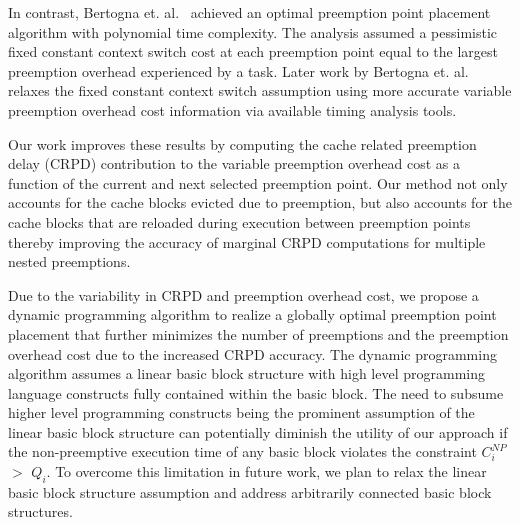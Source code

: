 In contrast, Bertogna et. al.~\cite{bertogna:10} achieved an optimal preemption point placement algorithm with polynomial time complexity.  The analysis assumed a pessimistic fixed constant context switch cost at each preemption point equal to the largest preemption overhead experienced by a task.  Later work by Bertogna et. al.~\cite{bertogna:11} relaxes the fixed constant context switch assumption using more accurate variable preemption overhead cost information via available timing analysis tools.

Our work improves these results by computing the cache related preemption delay (CRPD) contribution to the variable preemption overhead cost as a function of the current and next selected preemption point.  Our method not only accounts for the cache blocks evicted due to preemption, but also accounts for the cache blocks that are reloaded during execution between preemption points thereby improving the accuracy of marginal CRPD computations for multiple nested preemptions.

Due to the variability in CRPD and preemption overhead cost, we propose a dynamic programming algorithm to realize a globally optimal preemption point placement that further minimizes the number of preemptions and the preemption overhead cost due to the increased CRPD accuracy.  The dynamic programming algorithm assumes a linear basic block structure with high level programming language constructs fully contained within the basic block.  The need to subsume higher level programming constructs being the prominent assumption of the linear basic block structure can potentially diminish the utility of our approach if the non-preemptive execution time of any basic block violates the constraint \begin{math}C_{i}^{NP}\end{math} \begin{math}>\end{math} \begin{math}Q_{i}\end{math}. To overcome this limitation in future work, we plan to relax the linear basic block structure assumption and address arbitrarily connected basic block structures.
